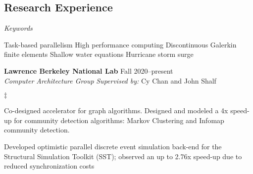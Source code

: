 \documentclass[margin,line]{res}
\newenvironment{list1}{
  \begin{list}{\ding{113}}{%
      \setlength{\itemsep}{0in}
      \setlength{\parsep}{0in} \setlength{\parskip}{0in}
      \setlength{\topsep}{0in} \setlength{\partopsep}{0in}
      \setlength{\leftmargin}{0.17in}}}{\end{list}}
\newenvironment{list2}{
  \begin{list}{$\ddagger$}{%
      \setlength{\itemsep}{0in}
      \setlength{\parsep}{0in} \setlength{\parskip}{0in}
      \setlength{\topsep}{0in} \setlength{\partopsep}{0in}
      \setlength{\leftmargin}{0.2in}}}{\end{list}}
\def\keywordgap{\hspace{2pt minus.5pt}}
\newcommand\keywordsep{\keywordgap\textbullet\keywordgap}
\begin{document}
\begin{resume}
\section{\sc Research Experience}
\textit{Keywords}
\vspace{0.05in}
\begin{list1}
\item[] Task-based parallelism \keywordsep High performance computing \keywordsep Discontinuous Galerkin finite elements \keywordsep Shallow water equations \keywordsep Hurricane storm surge
\end{list1}


\textbf{Lawrence Berkeley National Lab} \hfill Fall 2020--present\\
\textit{Computer Architecture Group} \hfill {\it Supervised by:} Cy Chan and John Shalf\\
\vspace{-0.1in}
\begin{list2}
\item Co-designed accelerator for graph algorithms. Designed and modeled a 4x speed-up for community detection algorithms: Markov Clustering and Infomap community detection.
\item Developed optimistic parallel discrete event simulation back-end for the Structural Simulation Toolkit (SST); observed an up to 2.76x speed-up due to reduced synchronization costs
\end{list2}
\vspace{-0.1in}


\end{resume}
\end{document}
